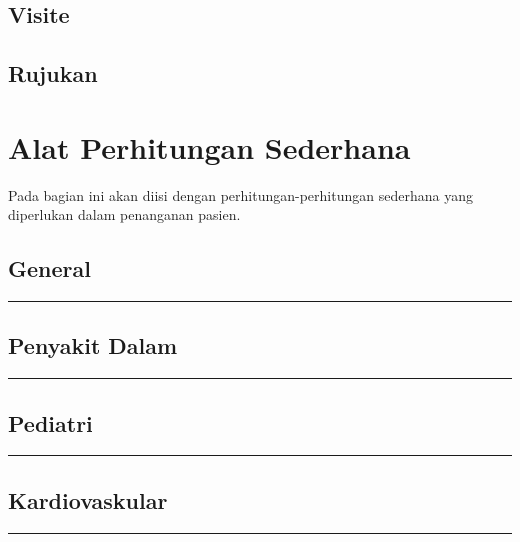 \documentclass[
]{book}
\begin{document}
\hypertarget{visite}{%
\section{Visite}\label{visite}}

\hypertarget{rujukan}{%
\section{Rujukan}\label{rujukan}}

\hypertarget{alat-perhitungan-sederhana}{%
\chapter{Alat Perhitungan Sederhana}\label{alat-perhitungan-sederhana}}

Pada bagian ini akan diisi dengan perhitungan-perhitungan sederhana yang diperlukan dalam penanganan pasien.

\hypertarget{general}{%
\section{General}\label{general}}

\begin{center}\rule{0.5\linewidth}{0.5pt}\end{center}

\hypertarget{penyakit-dalam}{%
\section{Penyakit Dalam}\label{penyakit-dalam}}

\begin{center}\rule{0.5\linewidth}{0.5pt}\end{center}

\hypertarget{pediatri}{%
\section{Pediatri}\label{pediatri}}

\begin{center}\rule{0.5\linewidth}{0.5pt}\end{center}

\hypertarget{kardiovaskular}{%
\section{Kardiovaskular}\label{kardiovaskular}}

\begin{center}\rule{0.5\linewidth}{0.5pt}\end{center}
\end{document}
